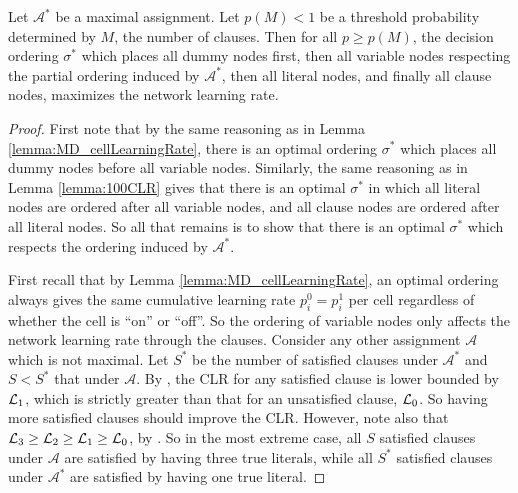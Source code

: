 \begin{lemma} \label{lemma:bestOrder}
    Let $\mathcal{A}^*$ be a maximal assignment.  Let $p(M) < 1$ be a threshold probability determined by $M$, the number of clauses. Then for all $p \geq p(M)$, the decision ordering $\sigma^*$ which places all dummy nodes first, then all variable nodes respecting the partial ordering induced by $\mathcal{A}^*$, then all literal nodes, and finally all clause nodes, maximizes the network learning rate.
\end{lemma}
\begin{proof}
    First note that by the same reasoning as in Lemma \ref{lemma:MD_cellLearningRate}, there is an optimal ordering $\sigma^*$ which places all dummy nodes before all variable nodes. Similarly, the same reasoning as in Lemma \ref{lemma:100CLR} gives that there is an optimal $\sigma^*$ in which all literal nodes are ordered after all variable nodes, and all clause nodes are ordered after all literal nodes. So all that remains is to show that there is an optimal $\sigma^*$ which respects the ordering induced by $\mathcal{A}^*$. 

    First recall that by Lemma \ref{lemma:MD_cellLearningRate}, an optimal ordering always gives the same cumulative learning rate $p_i^0 = p_i^1$ per cell regardless of whether the cell is ``on'' or ``off''. So the ordering of variable nodes only affects the network learning rate through the clauses. Consider any other assignment $\mathcal{A}$ which is not maximal. Let $S^*$ be the number of satisfied clauses under $\mathcal{A}^*$ and $S < S^*$ that under $\mathcal{A}$. By , the CLR for any satisfied clause is lower bounded by $\mathcal{L}_1$, which is strictly greater than that for an unsatisfied clause, $\mathcal{L}_0$. So having more satisfied clauses should improve the CLR. However, note also that $\mathcal{L}_3 \geq \mathcal{L}_2 \geq \mathcal{L}_1 \geq \mathcal{L}_0$, by . So in the most extreme case, all $S$ satisfied clauses under $\mathcal{A}$ are satisfied by having three true literals, while all $S^*$ satisfied clauses under $\mathcal{A}^*$ are satisfied by having one true literal. 


\end{proof}
